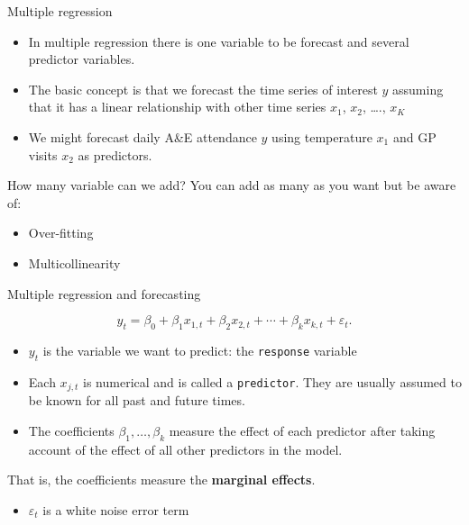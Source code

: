 \documentclass[
  14pt,
  ignorenonframetext,
  aspectratio=169,
]{beamer}
\providecommand{\tightlist}{%
  \setlength{\itemsep}{0pt}\setlength{\parskip}{0pt}}
\begin{document}
\begin{frame}{Multiple regression}
\protect{}\label{multiple-regression}
\begin{itemize}
\tightlist
\item
  In multiple regression there is one variable to be forecast and
  several predictor variables.
\item
  The basic concept is that we forecast the time series of interest
  \(y\) assuming that it has a linear relationship with other time
  series \(x_1\), \(x_2\), \ldots., \(x_K\)
\item
  We might forecast daily A\&E attendance \(y\) using temperature
  \(x_1\) and GP visits \(x_2\) as predictors.
\end{itemize}
\end{frame}

\begin{frame}{How many variable can we add?}
\protect{}\label{how-many-variable-can-we-add}
You can add as many as you want but be aware of:

\begin{itemize}
\tightlist
\item
  Over-fitting
\item
  Multicollinearity
\end{itemize}
\end{frame}

\begin{frame}[fragile]{Multiple regression and forecasting}
\protect{}\label{multiple-regression-and-forecasting}
\fontsize{13}{15}\sf

\begin{block}{}\vspace*{-0.3cm}
$$
  y_t = \beta_0 + \beta_1 x_{1,t} + \beta_2 x_{2,t} + \cdots + \beta_kx_{k,t} + \varepsilon_t.
$$

\end{block}

\begin{itemize}
\item
  \(y_t\) is the variable we want to predict: the \texttt{response}
  variable
\item
  Each \(x_{j,t}\) is numerical and is called a \texttt{predictor}. They
  are usually assumed to be known for all past and future times.
\item
  The coefficients \(\beta_1,\dots,\beta_k\) measure the effect of each
  predictor after taking account of the effect of all other predictors
  in the model.
\end{itemize}

That is, the coefficients measure the \textbf{marginal effects}.

\begin{itemize}
\tightlist
\item
  \(\varepsilon_t\) is a white noise error term
\end{itemize}
\end{frame}
\end{document}
